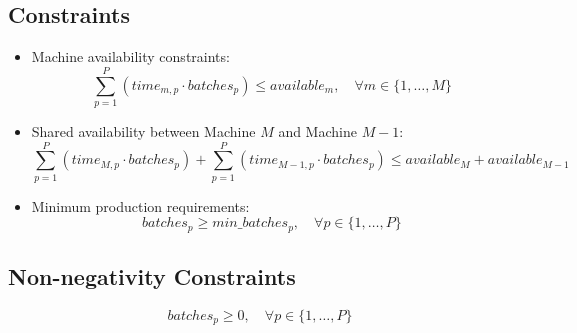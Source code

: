 \documentclass{article}
\begin{document}
\subsection*{Constraints}
\begin{itemize}
    \item Machine availability constraints:
    \[
    \sum_{p=1}^{P} (time_{m,p} \cdot batches_{p}) \leq available_{m}, \quad \forall m \in \{1, \ldots, M\}
    \]
    \item Shared availability between Machine \( M \) and Machine \( M-1 \):
    \[
    \sum_{p=1}^{P} (time_{M,p} \cdot batches_{p}) + \sum_{p=1}^{P} (time_{M-1,p} \cdot batches_{p}) \leq available_{M} + available_{M-1}
    \]
    \item Minimum production requirements:
    \[
    batches_{p} \geq min\_batches_{p}, \quad \forall p \in \{1, \ldots, P\}
    \]
\end{itemize}

\subsection*{Non-negativity Constraints}
\[
batches_{p} \geq 0, \quad \forall p \in \{1, \ldots, P\}
\]
\end{document}
